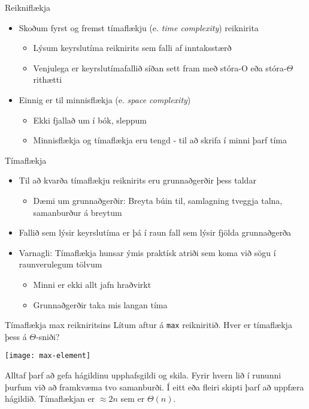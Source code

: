 \documentclass[handout]{beamer}
\begin{document}
\begin{frame}{Reikniflækja}
\begin{itemize}
 \item Skoðum fyrst og fremst tímaflækju (e. \emph{time complexity}) reiknirita
 \begin{itemize}
  \item Lýsum keyrslutíma reiknirits sem falli af inntaksstærð
  \item Venjulega er keyrslutímafallið síðan sett fram með stóra-O eða stóra-$\Theta$ rithætti \pause
 \end{itemize}
 \item Einnig er til minnisflækja (e. \emph{space complexity})
 \begin{itemize}
  \item Ekki fjallað um í bók, sleppum
  \item Minnisflækja og tímaflækja eru tengd - til að skrifa í minni þarf tíma
 \end{itemize}
\end{itemize}
\end{frame}

\begin{frame}{Tímaflækja}
\begin{itemize}
 \item Til að kvarða tímaflækju reiknirits eru grunnaðgerðir þess taldar
 \begin{itemize}
  \item Dæmi um grunnaðgerðir: Breyta búin til, samlagning tveggja talna, samanburður á breytum
 \end{itemize}
 \item Fallið sem lýsir keyrslutíma er þá í raun fall sem lýsir fjölda grunnaðgerða
 \item Varnagli: Tímaflækja hunsar ýmis praktísk atriði sem koma við sögu í raunverulegum tölvum
 \begin{itemize}
  \item Minni er ekki allt jafn hraðvirkt
  \item Grunnaðgerðir taka mis langan tíma
 \end{itemize}
\end{itemize}
\end{frame}

\begin{frame}{Tímaflækja max reikniritsins}
Lítum aftur á \texttt{max} reikniritið. Hver er tímaflækja þess á $\Theta$-sniði?

\texttt{[image: max-element]} \pause

Alltaf þarf að gefa hágildinu upphafsgildi og skila. Fyrir hvern lið í rununni þurfum við að framkvæma tvo samanburði. Í eitt eða fleiri skipti þarf að uppfæra hágildið. Tímaflækjan er $\approx 2n$ sem er $\Theta(n)$.
\end{frame}
\end{document}

